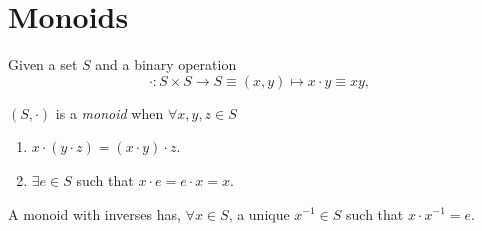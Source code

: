 \section{Monoids}

\begin{defn}[Monoid]
  \label{def:monoid}
  Given a set $S$ and a binary operation
  $$
  \cdot : S \times S \to S \equiv (x, y) \mapsto x \cdot y \equiv xy,
  $$

  $(S, \cdot)$ is a \emph{monoid} when $\forall x, y, z \in S$
  \begin{enumerate}
    \item{$x \cdot (y \cdot z) = (x \cdot y) \cdot z$.}
    \item{$\exists e \in S$ such that $x \cdot e = e \cdot x = x$.}
  \end{enumerate}
\end{defn}

A monoid with inverses has, $\forall x \in S$, a unique $x^{-1} \in S$
such that $x \cdot x^{-1} = e$.


